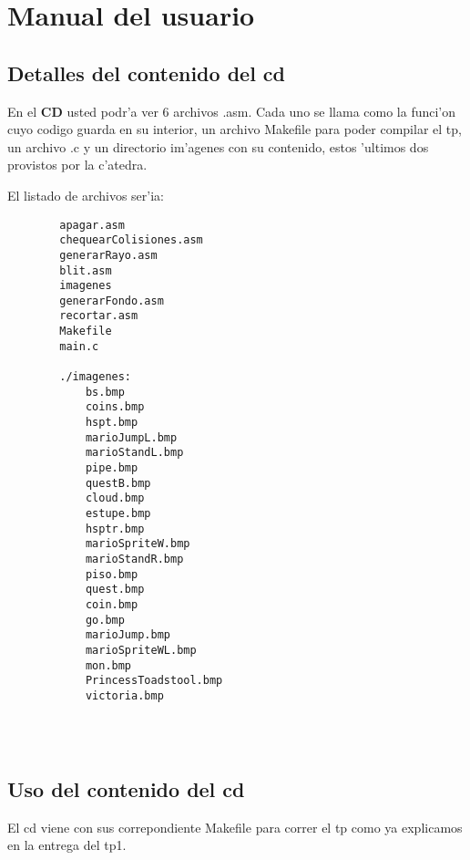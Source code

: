 \section{Manual del usuario}

\subsection{Detalles del contenido del cd}

	En el \textbf{CD} usted podr'a ver 6 archivos .asm. Cada uno se llama como
la funci'on cuyo codigo guarda en su interior, un archivo Makefile para poder
compilar el tp, un archivo .c y un directorio im'agenes con su contenido, estos
'ultimos dos provistos por la c'atedra.

	El listado de archivos ser'ia:
\begin{verbatim}
		apagar.asm     
		chequearColisiones.asm  
		generarRayo.asm 
		blit.asm 
		imagenes 
		generarFondo.asm
		recortar.asm
		Makefile
		main.c

		./imagenes:
			bs.bmp
			coins.bmp
			hspt.bmp
			marioJumpL.bmp
			marioStandL.bmp
			pipe.bmp
			questB.bmp
			cloud.bmp
			estupe.bmp
			hsptr.bmp
			marioSpriteW.bmp
			marioStandR.bmp
			piso.bmp
			quest.bmp
			coin.bmp
			go.bmp
			marioJump.bmp
			marioSpriteWL.bmp
			mon.bmp
			PrincessToadstool.bmp
			victoria.bmp




\end{verbatim}

\subsection{Uso del contenido del cd}

El cd viene con sus correpondiente Makefile para correr el tp como ya
explicamos en la entrega del tp1.

